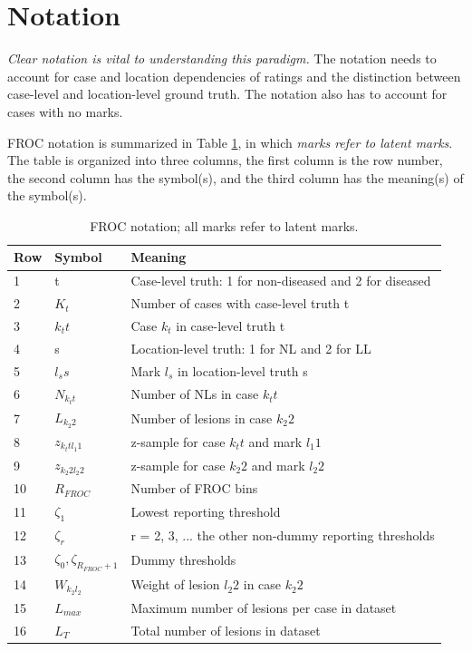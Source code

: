\documentclass[
]{book}
\begin{document}
\hypertarget{empirical-notation}{%
\section{Notation}\label{empirical-notation}}

\emph{Clear notation is vital to understanding this paradigm.} The notation needs to account for case and location dependencies of ratings and the distinction between case-level and location-level ground truth. The notation also has to account for cases with no marks.

FROC notation is summarized in Table \ref{tab:empirical-notation}, in which \emph{marks refer to latent marks}. The table is organized into three columns, the first column is the row number, the second column has the symbol(s), and the third column has the meaning(s) of the symbol(s).

\begin{table}

\caption{\label{tab:empirical-notation}FROC notation; all marks refer to latent marks.}
\centering
\begin{tabular}[t]{l|l|l}
\hline
Row & Symbol & Meaning\\
\hline
1 & t & Case-level truth: 1 for non-diseased and 2 for diseased\\
\hline
2 & $K_t$ & Number of cases with case-level truth t\\
\hline
3 & $k_t t$ & Case $k_t$ in case-level truth t\\
\hline
4 & s & Location-level truth: 1 for NL and 2 for LL\\
\hline
5 & $l_s s$ & Mark $l_s$ in location-level truth s\\
\hline
6 & $N_{k_t t}$ & Number of NLs in case $k_t t$\\
\hline
7 & $L_{k_2 2}$ & Number of lesions in case $k_2 2$\\
\hline
8 & $z_{k_t t l_1 1}$ & z-sample for case $k_t t$ and mark $l_1 1$\\
\hline
9 & $z_{k_2 2 l_2 2}$ & z-sample for case $k_2 2$ and mark $l_2 2$\\
\hline
10 & $R_{FROC}$ & Number of FROC bins\\
\hline
11 & $\zeta_1$ & Lowest reporting threshold\\
\hline
12 & $\zeta_r$ & r = 2, 3, ... the other non-dummy reporting thresholds\\
\hline
13 & $\zeta_0, \zeta_{R_{FROC}+1}$ & Dummy thresholds\\
\hline
14 & $W_{k_2 l_2}$ & Weight of lesion $l_2 2$ in case $k_2 2$\\
\hline
15 & $L_{max}$ & Maximum number of lesions per case in dataset\\
\hline
16 & $L_T$ & Total number of lesions in dataset\\
\hline
\end{tabular}
\end{table}
\end{document}
